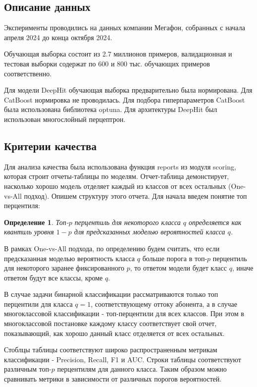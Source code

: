 \documentclass{article}
\newtheorem{definition}{Определение}
\begin{document}
\subsection{Описание данных}

Эксперименты проводились на данных компании Мегафон, собранных с начала апреля 2024 до конца октября 2024. 

Обучающая выборка состоит из 2.7 миллионов примеров, валидационная и тестовая выборки содержат по 600 и 800 тыс. обучающих примеров соответственно. 

Для модели DeepHit обучающая выборка предварительно была нормирована. Для CatBoost нормировка не проводилась. Для подбора гиперпараметров CatBoost была использована библиотека optuna. Для архитектуры DeepHit был использован многослойный перцептрон.

\subsection{Критерии качества}

Для анализа качества была использована функция reports из модуля scoring, которая строит отчеты-таблицы по моделям. Отчет-таблица демонстирует, насколько хорошо модель отделяет каждый из классов от всех остальных (One-vs-All подход). Опишем структуру этого отчета. Для начала введем понятие топ перцентиля: 

\begin{definition}
Топ-$p$ перцентиль для некоторого класса $q$ определяется как квантиль уровня $1-p$ для предсказанных моделью вероятностей класса $q$.
\end{definition}

В рамках One-vs-All подхода, по определению будем считать, что если предсказанная моделью вероятность класса $q$ больше порога в топ-$p$ перцентиль для некоторого заранее фиксированного $p$, то ответом модели будет класс $q$, иначе ответом будут все классы, кроме $q$.

В случае задачи бинарной классификации рассматриваются только топ перцентили для класса $q = 1$, соответствующему оттоку абонента, а в случае многоклассовой классификации - топ-перцентили для всех классов. При этом в многоклассовой постановке каждому классу соответствует свой отчет, показывающий, как хорошо данный класс отделяется от всех остальных. 

Стоблцы таблицы соответствуют широко распространенным метрикам классификации - Precision, Recall, F1 и AUC. Строки таблицы соответствуют различным топ-$p$ перцентилям для данного класса. Таким образом можно сравнивать метрики в зависимости от различных порогов вероятностей. 
\end{document}
